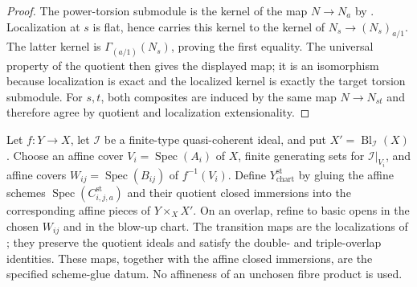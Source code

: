 \begin{proof}
  \leanok
  The power-torsion submodule is the kernel of the map
  $N\to N_a$ by
  .  Localization at
  $s$ is flat, hence carries this kernel to the kernel of
  $N_s\to (N_s)_{a/1}$.  The latter kernel is
  $\Gamma_{(a/1)}(N_s)$, proving the first equality.  The universal property
  of the quotient then gives the displayed map; it is an isomorphism because
  localization is exact and the localized kernel is exactly the target
  torsion submodule.  For $s,t$, both composites are induced by the same map
  $N\to N_{st}$ and therefore agree by quotient and localization
  extensionality.
\end{proof}

\begin{definition}
  \label{def:nagata-strict-transform-closed-chart-model}

  Let $f\colon Y\to X$, let $\mathcal I$ be a finite-type quasi-coherent
  ideal, and put $X'=\operatorname{Bl}_{\mathcal I}(X)$.  Choose an affine
  cover $V_i=\operatorname{Spec}(A_i)$ of $X$, finite generating sets for
  $\mathcal I|_{V_i}$, and affine covers
  $W_{ij}=\operatorname{Spec}(B_{ij})$ of $f^{-1}(V_i)$.  Define
  $Y^{\mathrm{st}}_{\mathrm{chart}}$ by gluing the affine schemes
  $\operatorname{Spec}(C_{i,j,a}^{\mathrm{st}})$ and their quotient closed
  immersions into the corresponding affine pieces of $Y\times_XX'$.
  On an overlap, refine to basic opens in the chosen $W_{ij}$ and in the
  blow-up chart.  The transition maps are the localizations of
  ; they preserve
  the quotient ideals and satisfy the double- and triple-overlap identities.
  These maps, together with the affine closed immersions, are the specified
  scheme-glue datum.  No affineness of an unchosen fibre product is used.
\end{definition}

